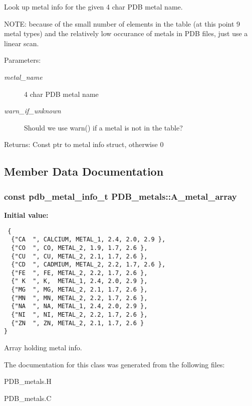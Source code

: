 Look up metal info for the given 4 char PDB metal name. 

NOTE: because of the small number of elements in the table (at this point 9 metal types) and the relatively low occurance of metals in PDB files, just use a linear scan.

\begin{Desc}
\item[Parameters:]
\begin{description}
\item[{\em metal\_\-name}]4 char PDB metal name \item[{\em warn\_\-if\_\-unknown}]Should we use warn() if a metal is not in the table? \end{description}
\end{Desc}
\begin{Desc}
\item[Returns:]Const ptr to metal info struct, otherwise 0 \end{Desc}


\subsection{Member Data Documentation}
\subsubsection{\setlength{\rightskip}{0pt plus 5cm}const \bf{pdb\_\-metal\_\-info\_\-t} \bf{PDB\_\-metals::A\_\-metal\_\-array}\hspace{0.3cm}{\tt  [static, private]}}\label{classASCbase_1_1PDB__metals_c8b5b8eb8f21b989c996ca5be4fb4773}


\textbf{Initial value:}

\begin{Code}\begin{verbatim} {
  {"CA  ", CALCIUM, METAL_1, 2.4, 2.0, 2.9 },
  {"CO  ", CO, METAL_2, 1.9, 1.7, 2.6 },
  {"CU  ", CU, METAL_2, 2.1, 1.7, 2.6 },
  {"CD  ", CADMIUM, METAL_2, 2.2, 1.7, 2.6 },
  {"FE  ", FE, METAL_2, 2.2, 1.7, 2.6 },
  {" K  ", K,  METAL_1, 2.4, 2.0, 2.9 },
  {"MG  ", MG, METAL_2, 2.1, 1.7, 2.6 },
  {"MN  ", MN, METAL_2, 2.2, 1.7, 2.6 },
  {"NA  ", NA, METAL_1, 2.4, 2.0, 2.9 },
  {"NI  ", NI, METAL_2, 2.2, 1.7, 2.6 },
  {"ZN  ", ZN, METAL_2, 2.1, 1.7, 2.6 }
}
\end{verbatim}\end{Code}
Array holding metal info. 



The documentation for this class was generated from the following files:\begin{CompactItemize}
\item 
PDB\_\-metals.H\item 
PDB\_\-metals.C\end{CompactItemize}
